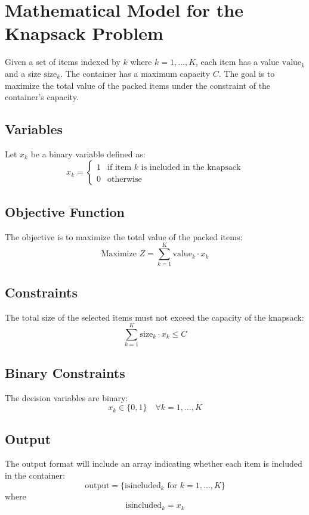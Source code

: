 \documentclass{article}
\begin{document}
\section*{Mathematical Model for the Knapsack Problem}

Given a set of items indexed by \( k \) where \( k = 1, \ldots, K \), each item has a value \( \text{value}_k \) and a size \( \text{size}_k \). The container has a maximum capacity \( C \). The goal is to maximize the total value of the packed items under the constraint of the container's capacity.

\subsection*{Variables}
Let \( x_k \) be a binary variable defined as:
\[
x_k = 
\begin{cases}
1 & \text{if item } k \text{ is included in the knapsack} \\
0 & \text{otherwise}
\end{cases}
\]

\subsection*{Objective Function}
The objective is to maximize the total value of the packed items:
\[
\text{Maximize } Z = \sum_{k=1}^{K} \text{value}_k \cdot x_k
\]

\subsection*{Constraints}
The total size of the selected items must not exceed the capacity of the knapsack:
\[
\sum_{k=1}^{K} \text{size}_k \cdot x_k \leq C
\]

\subsection*{Binary Constraints}
The decision variables are binary:
\[
x_k \in \{0, 1\} \quad \forall k = 1, \ldots, K
\]

\subsection*{Output}
The output format will include an array indicating whether each item is included in the container:
\[
\text{output} = \{ \text{isincluded}_k \text{ for } k = 1, \ldots, K \}
\]
where
\[
\text{isincluded}_k = x_k
\]
\end{document}
